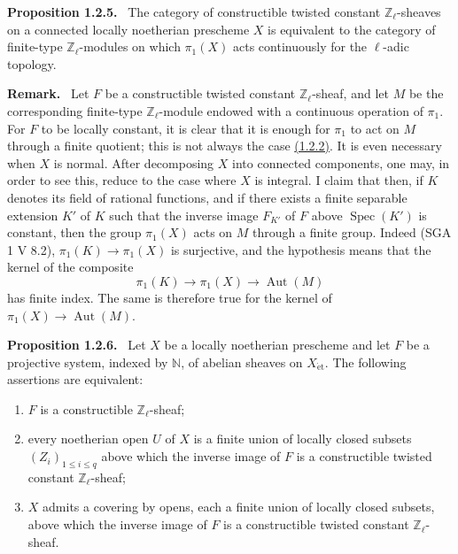 \documentclass[11pt]{article}
\newenvironment{statement}[1]{\par\medskip\noindent\textbf{#1.}\ }{\par\medskip}
\DeclareMathOperator{\Spec}{Spec}
\providecommand{\Aut}{\operatorname{Aut}}
\providecommand{\Spec}{\operatorname{Spec}}
\providecommand{\Spec}{\operatorname{Spec}}
\providecommand{\Aut}{\operatorname{Aut}}
\providecommand{\Spec}{\operatorname{Spec}}
\providecommand{\Spec}{\operatorname{Spec}}
\begin{document}
\label{sga5:VI:proposition:1.2.5}\begin{statement}{Proposition 1.2.5}
The category of constructible twisted constant \(\mathbb Z_\ell\)-sheaves on a connected locally noetherian prescheme \(X\) is equivalent to the category of finite-type \(\mathbb Z_\ell\)-modules on which \(\pi_1(X)\) acts continuously for the \(\ell\)-adic topology.
\end{statement}

\begin{statement}{Remark}
Let \(F\) be a constructible twisted constant \(\mathbb Z_\ell\)-sheaf, and let \(M\) be the corresponding finite-type \(\mathbb Z_\ell\)-module endowed with a continuous operation of \(\pi_1\). For \(F\) to be locally constant, it is clear that it is enough for \(\pi_1\) to act on \(M\) through a finite quotient; this is not always the case \hyperref[sga5:VI:example:1.2.2]{(1.2.2)}. It is even necessary when \(X\) is normal. After decomposing \(X\) into connected components, one may, in order to see this, reduce to the case where \(X\) is integral. I claim that then, if \(K\) denotes its field of rational functions, and if there exists a finite separable extension \(K'\) of \(K\) such that the inverse image \(F_{K'}\) of \(F\) above \(\Spec(K')\) is constant, then the group \(\pi_1(X)\) acts on \(M\) through a finite group. Indeed (SGA 1 V 8.2), \(\pi_1(K)\to\pi_1(X)\) is surjective, and the hypothesis means that the kernel of the composite
\[
\pi_1(K)\longrightarrow \pi_1(X)\longrightarrow \Aut(M)
\]
has finite index. The same is therefore true for the kernel of \(\pi_1(X)\to\Aut(M)\).
\end{statement}

\label{sga5:VI:proposition:1.2.6}\begin{statement}{Proposition 1.2.6}
Let \(X\) be a locally noetherian prescheme and let \(F\) be a projective system, indexed by \(\mathbb N\), of abelian sheaves on \(X_{\mathrm{\acute et}}\). The following assertions are equivalent:
\begin{enumerate}[label=(\roman*)]
\item \(F\) is a constructible \(\mathbb Z_\ell\)-sheaf;
\item every noetherian open \(U\) of \(X\) is a finite union of locally closed subsets \((Z_i)_{1\le i\le q}\) above which the inverse image of \(F\) is a constructible twisted constant \(\mathbb Z_\ell\)-sheaf;
\item \(X\) admits a covering by opens, each a finite union of locally closed subsets, above which the inverse image of \(F\) is a constructible twisted constant \(\mathbb Z_\ell\)-sheaf.
\end{enumerate}
\end{statement}
\end{document}
